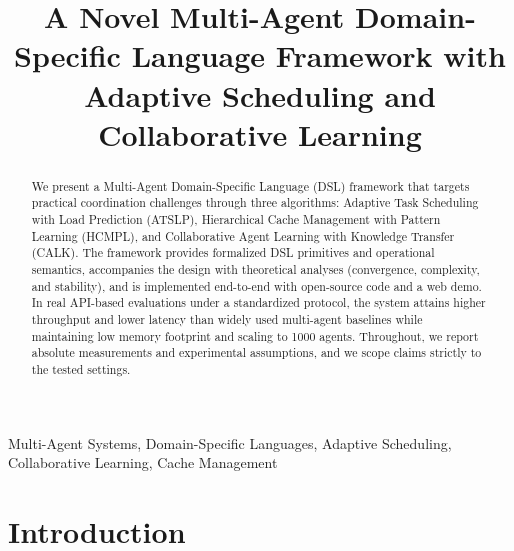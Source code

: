 \documentclass[conference]{IEEEtran}
\begin{document}
\title{A Novel Multi-Agent Domain-Specific Language Framework with Adaptive Scheduling and Collaborative Learning}

\author{
\and
{}
}

\maketitle

\begin{abstract}
We present a Multi-Agent Domain-Specific Language (DSL) framework that targets practical coordination challenges through three algorithms: Adaptive Task Scheduling with Load Prediction (ATSLP), Hierarchical Cache Management with Pattern Learning (HCMPL), and Collaborative Agent Learning with Knowledge Transfer (CALK). The framework provides formalized DSL primitives and operational semantics, accompanies the design with theoretical analyses (convergence, complexity, and stability), and is implemented end-to-end with open-source code and a web demo. In real API-based evaluations under a standardized protocol, the system attains higher throughput and lower latency than widely used multi-agent baselines while maintaining low memory footprint and scaling to 1000 agents. Throughout, we report absolute measurements and experimental assumptions, and we scope claims strictly to the tested settings.
\end{abstract}

\begin{IEEEkeywords}
Multi-Agent Systems, Domain-Specific Languages, Adaptive Scheduling, Collaborative Learning, Cache Management
\end{IEEEkeywords}

\section{Introduction}
\end{document}
